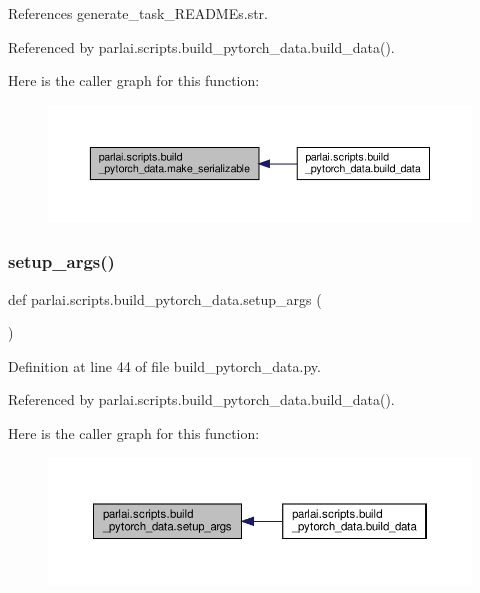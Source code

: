References generate\+\_\+task\+\_\+\+R\+E\+A\+D\+M\+Es.\+str.



Referenced by parlai.\+scripts.\+build\+\_\+pytorch\+\_\+data.\+build\+\_\+data().

Here is the caller graph for this function\+:
\nopagebreak
\begin{figure}[H]
\begin{center}
\leavevmode
\includegraphics[width=350pt]{namespaceparlai_1_1scripts_1_1build__pytorch__data_a1c8f4633b7dc8e990a3e1f6c3e92bd3f_icgraph}
\end{center}
\end{figure}
\mbox{\label{namespaceparlai_1_1scripts_1_1build__pytorch__data_afd88c85ffdbc233b56542e013352351a}} 
\subsubsection{\texorpdfstring{setup\+\_\+args()}{setup\_args()}}
{\footnotesize\ttfamily def parlai.\+scripts.\+build\+\_\+pytorch\+\_\+data.\+setup\+\_\+args (\begin{DoxyParamCaption}{ }\end{DoxyParamCaption})}



Definition at line 44 of file build\+\_\+pytorch\+\_\+data.\+py.



Referenced by parlai.\+scripts.\+build\+\_\+pytorch\+\_\+data.\+build\+\_\+data().

Here is the caller graph for this function\+:
\nopagebreak
\begin{figure}[H]
\begin{center}
\leavevmode
\includegraphics[width=350pt]{namespaceparlai_1_1scripts_1_1build__pytorch__data_afd88c85ffdbc233b56542e013352351a_icgraph}
\end{center}
\end{figure}
